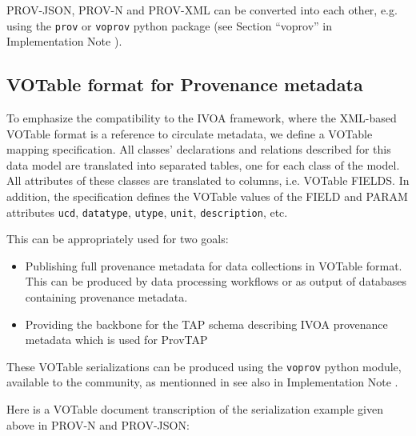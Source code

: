 \noindent
PROV-JSON, PROV-N and PROV-XML can be converted into each other, e.g.  using the \texttt{prov} or \texttt{voprov} python package (see Section ``voprov'' in Implementation Note \citep{std:ProvenanceImplementationNote}).

\subsection{VOTable format for Provenance metadata} 


To emphasize the compatibility to the IVOA framework, where the XML-based VOTable
format is a reference to circulate metadata, we define a VOTable mapping
specification. All classes' declarations and relations described for this data model are translated into separated tables, one for each class of the model.
All attributes of these classes are
translated to columns, i.e. VOTable FIELDS. In addition, the specification
defines the VOTable values of the FIELD and PARAM attributes \texttt{ucd},
\texttt{datatype}, \texttt{utype}, \texttt{unit}, \texttt{description}, etc.

This can be appropriately used for two goals:
\begin{itemize}
	\item Publishing full provenance metadata for data collections in VOTable format. This can be produced by data processing workflows or as output of databases containing provenance metadata.
	\item Providing the backbone for the TAP schema describing IVOA provenance metadata which is used for ProvTAP 
\end{itemize}

These VOTable serializations can be produced using the \texttt{voprov} python module, available to the community, as mentionned in see also in Implementation Note \citep[]{std:ProvenanceImplementationNote}.

Here is a VOTable document transcription of the serialization example given above in PROV-N and PROV-JSON:



